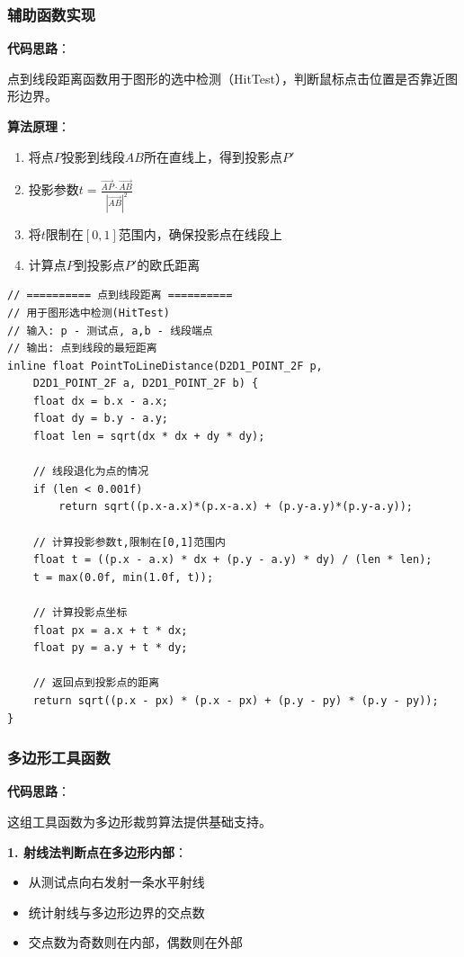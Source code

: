 \documentclass[12pt,a4paper]{article}
\begin{document}
\begin{tcolorbox}
\subsubsection{辅助函数实现}

\textbf{代码思路}：

点到线段距离函数用于图形的选中检测（HitTest），判断鼠标点击位置是否靠近图形边界。

\textbf{算法原理}：
\begin{enumerate}
    \item 将点$P$投影到线段$AB$所在直线上，得到投影点$P'$
    \item 投影参数$t = \frac{\vec{AP} \cdot \vec{AB}}{|\vec{AB}|^2}$
    \item 将$t$限制在$[0,1]$范围内，确保投影点在线段上
    \item 计算点$P$到投影点$P'$的欧氏距离
\end{enumerate}

\begin{lstlisting}[caption={点到线段距离计算}]
// ========== 点到线段距离 ==========
// 用于图形选中检测(HitTest)
// 输入: p - 测试点, a,b - 线段端点
// 输出: 点到线段的最短距离
inline float PointToLineDistance(D2D1_POINT_2F p, 
    D2D1_POINT_2F a, D2D1_POINT_2F b) {
    float dx = b.x - a.x;
    float dy = b.y - a.y;
    float len = sqrt(dx * dx + dy * dy);
    
    // 线段退化为点的情况
    if (len < 0.001f) 
        return sqrt((p.x-a.x)*(p.x-a.x) + (p.y-a.y)*(p.y-a.y));
    
    // 计算投影参数t,限制在[0,1]范围内
    float t = ((p.x - a.x) * dx + (p.y - a.y) * dy) / (len * len);
    t = max(0.0f, min(1.0f, t));
    
    // 计算投影点坐标
    float px = a.x + t * dx;
    float py = a.y + t * dy;
    
    // 返回点到投影点的距离
    return sqrt((p.x - px) * (p.x - px) + (p.y - py) * (p.y - py));
}
\end{lstlisting}

\subsubsection{多边形工具函数}

\textbf{代码思路}：

这组工具函数为多边形裁剪算法提供基础支持。

\textbf{1. 射线法判断点在多边形内部}：
\begin{itemize}
    \item 从测试点向右发射一条水平射线
    \item 统计射线与多边形边界的交点数
    \item 交点数为奇数则在内部，偶数则在外部
\end{itemize}


\end{tcolorbox}
\end{document}
